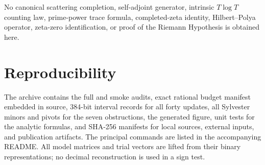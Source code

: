 \documentclass[11pt]{article}
\theoremstyle{definition}
\theoremstyle{remark}
\begin{document}
No canonical scattering completion, self-adjoint generator, intrinsic
$T\log T$ counting law, prime-power trace formula, completed-zeta identity,
Hilbert--Polya operator, zeta-zero identification, or proof of the Riemann
Hypothesis is obtained here.

\section{Reproducibility}

The archive contains the full and smoke audits, exact rational budget
manifest embedded in source, 384-bit interval records for all forty updates,
all Sylvester minors and pivots for the seven obstructions, the generated
figure, unit tests for the analytic formulas, and SHA-256 manifests for local
sources, external inputs, and publication artifacts.  The principal commands
are listed in the accompanying README.  All model matrices and trial vectors
are lifted from their binary representations; no decimal reconstruction is
used in a sign test.



\end{document}
